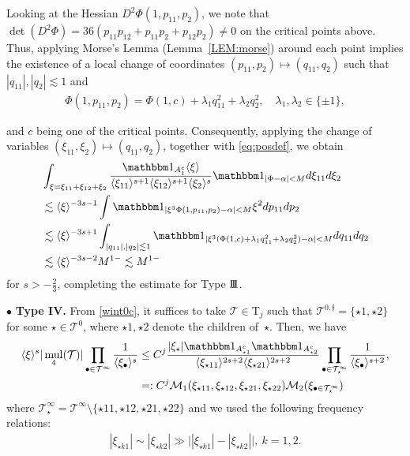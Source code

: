\documentclass[a4paper,
11pt,  reqno]{amsart}
\newcommand{\III}{\textup{I \hspace{-2.9mm} I \hspace{-2.9mm} I}}
\newcommand{\5}{\textup{V}}
\newcommand{\noi}{\noindent}
\newcommand{\ind}{\mathbbm 1}
\newcommand{\les}{\lesssim}
\theoremstyle{remark}
\newcommand{\bul}{\bullet}
\newcommand{\TT}{\mathcal{T}}
\newcommand{\Tr}{\mathrm{T}}
\newcommand{\al}{\alpha}
\newcommand{\jb}[1]
{\langle #1 \rangle}
\newcommand{\ff}{\mathfrak{f}}
\newcommand{\M}{\mathcal{M}}
\DeclareMathOperator{\mul}{mul}
\numberwithin{equation}{section}
\numberwithin{theorem}{section}
\begin{document}
\noi
Looking at the Hessian $D^2 \Phi(1, p_{11}, p_2)$, we note that
{
$\det (D^2 \Phi) = 36 (p_{11} p_{12} + p_{11} p_2 + p_{12} p_2) \ne0 $ 
}
on the critical points above. Thus, applying Morse's Lemma (Lemma~\ref{LEM:morse}) around each point implies the existence of a local change of coordinates $(p_{11},p_2) \mapsto (q_{11}, q_2)$ such that $|q_{11}|, |q_2| \les 1$ and 
\begin{align}
\Phi(1, p_{11},p_2) = \Phi(1, c) + \lambda_1q_{11}^2 + \lambda_2q_2^2, \quad \lambda_1,\lambda_2\in\{\pm1\},
\end{align}


\noi
{and $c$ being one of the critical points.}
Consequently, applying the change of variables $(\xi_{11},\xi_2) \mapsto (q_{11}, q_2)$, together with \eqref{eq:posdef}, we obtain
\begin{align}
&
\int_{\xi = \xi_{11} + \xi_{12} + \xi_2} \frac{\ind_{A_1^c}  \jb{\xi}}{ \jb{\xi_{11}}^{s+1} \jb{\xi_{12}}^{s+1} \jb{\xi_2}^s}
\ind_{|\Phi - \al| < M}
d\xi_{11} d\xi_2
\\
&
\les 
\jb{\xi}^{ - 3 s - 1   } \int \ind_{|\xi^3 \Phi(1, p_{11}, p_2) - \al| < M} \xi^2 dp_{11} dp_2
\\
&
\les 
\jb{\xi}^{- 3s + 1  } \int_{|q_{11}|, |q_2| \les 1} \ind_{| \xi^3( \Phi(1,c) + \lambda_1q_{11}^2 +  \lambda_2q_2^2 )- \al | < M  } dq_{11} d q_2
\\
&
\les 
\jb{\xi}^{- 3s -2   } M^{1-} \les M^{1-}
\end{align}
for $s>-\frac23$, completing the estimate for Type $\III$.


\smallskip 



\noi
$\bul$ \textbf{Type IV.}
From \eqref{wint0c}, it suffices to take 
$\TT\in\Tr_j$ such that $\TT^{0,\ff} = \{\star1,\star2\}$ for some $\star\in \TT^0$, where $\star1,\star2$ denote the children of~$\star$. 
Then, we have
\begin{align}\label{L24}
\jb{\xi}^s  |\mul_4(\TT)| 
\prod_{\bul \in \TT^\infty} \frac{1}{\jb{\xi_\bul}^s}
&\le
C^{j}
\frac{|\xi_\star| \ind_{A^c_{\star1}} \ind_{A^c_{\star2}} }{ 
\jb{\xi_{\star11}}^{2s+2} \jb{\xi_{\star21}}^{2s+2}  } \prod_{\bul\in \TT^\infty_\star} \frac{1}{\jb{\xi_\bul}^{s+2}}, \\ &=:
{C^j}
\mathcal{M}_1(\xi_{\star11}, \xi_{\star12}, \xi_{\star21}, \xi_{\star22})
\M_2(\xi_{\bul\in\TT^\infty_\star})
\end{align}
where $\TT^\infty_\star = \TT^\infty \setminus\{ \star11, \star12, \star21, \star22\}$ and we used the following frequency relations:
\begin{align}\label{L24freq}
|\xi_{\star k 1 } | \sim |\xi_{\star k2 } | \gg \big| |\xi_{\star k 1} | - |\xi_{\star k 2 }| \big|, \ k=1,2. 
\end{align}
\end{document}
